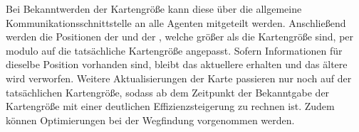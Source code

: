 Bei Bekanntwerden der Kartengröße kann diese über die allgemeine Kommunikationsschnittstelle an alle Agenten mitgeteilt werden. Anschließend werden die Positionen der \NextMapTiles und der \Agents, welche größer als die Kartengröße sind, per modulo auf die tatsächliche Kartengröße angepasst. Sofern Informationen für dieselbe Position vorhanden sind, bleibt das aktuellere \NextMapTile erhalten und das ältere wird verworfen. Weitere Aktualisierungen der Karte passieren nur noch auf der tatsächlichen Kartengröße, sodass ab dem Zeitpunkt der Bekanntgabe der Kartengröße mit einer deutlichen Effizienzsteigerung zu rechnen ist. Zudem können Optimierungen bei der Wegfindung vorgenommen werden.  


